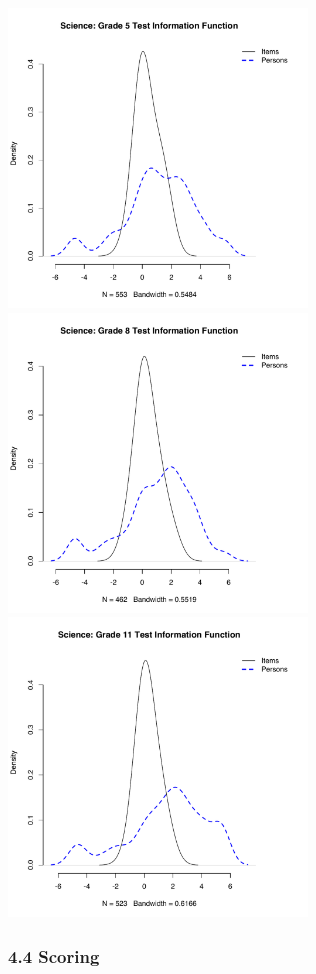 \documentclass[]{article}
\begin{document}
\FloatBarrier

\includegraphics[width=\textwidth,height=3.125in]{ipdens/science5ipdens.pdf}
\includegraphics[width=\textwidth,height=3.125in]{ipdens/science8ipdens.pdf}
\includegraphics[width=\textwidth,height=3.125in]{ipdens/science11ipdens.pdf}

\hypertarget{scoring}{%
\subsubsection{4.4 Scoring}\label{scoring}}
\end{document}
